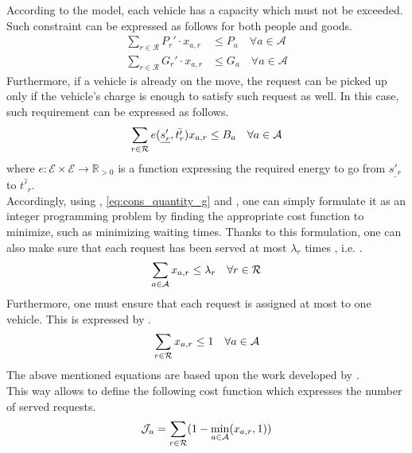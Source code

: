 According to the model, each vehicle has a capacity which must not be exceeded. Such constraint can be expressed as follows for both people and goods. 
\begin{align}
	\sum_{r \in \mathcal{R}} P_r' \cdot x_{a,r} &\leq P_a \quad \forall a \in \mathcal{A}\label{eq:cons_quantity_p}\\
	\sum_{r \in \mathcal{R}} G_r' \cdot x_{a,r} &\leq G_a \quad \forall a \in \mathcal{A}\label{eq:cons_quantity_g}
\end{align}
Furthermore, if a vehicle is already on the move, the request can be picked up only if the vehicle's charge is enough to satisfy such request as well. In this case, such requirement can be expressed as follows. 
\begin{equation}
	\sum_{r \in \mathcal{R}} e(\underline{s'_r}, \bar{t'_r}) x_{a,r}\leq B_a \quad \forall a \in \mathcal{A}\\
	\label{eq:cons_charg}
\end{equation}
where $e: \mathcal{E} \times \mathcal{E} \rightarrow \mathbb{R}_{>0}$ is a function expressing the required energy to go from $\underline{s'_r}$ to $\bar{t'_r}$.\\
Accordingly, using , \ref{eq:cons_quantity_g}  and  , one can simply formulate it as an integer programming problem by finding the appropriate cost function to minimize, such as minimizing waiting times. Thanks to this formulation, one can also make sure that each request has been served at most $\lambda_r$ times , i.e. . 
\begin{equation}
	\sum_{a \in \mathcal{A}} x_{a,r} \leq \lambda_r \quad \forall r \in \mathcal{R}\\
	\label{eq:req_served}
\end{equation}
Furthermore, one must ensure that each request is assigned at most to one vehicle. This is expressed by . 
\begin{equation}
	\sum_{r \in \mathcal{R}} x_{a,r} \leq 1\quad \forall a \in \mathcal{A}\\
	\label{eq:req_served_per_vehicle}
\end{equation}
The above mentioned equations are based upon the work developed by . \\
This way allows to define the following cost function which expresses the number of served requests.
\begin{equation}
	\mathcal{J}_u = \sum_{r \in \mathcal{R}} (1  - \min_{a \in \mathcal{A}} (x_{a,r},1))\\
	\label{eq:req_unserved}
\end{equation}
